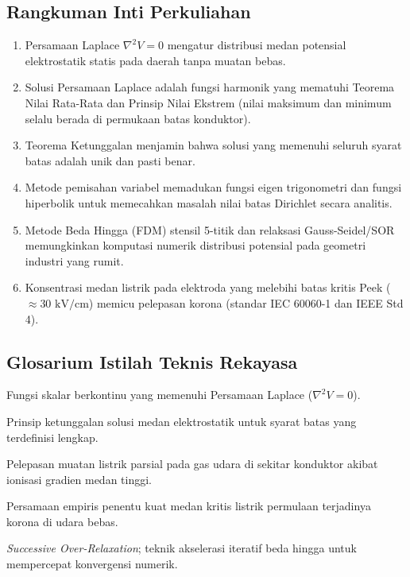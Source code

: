\documentclass[11pt,a4paper]{article}
\theoremstyle{definition}
\begin{document}
\subsection{Rangkuman Inti Perkuliahan}
\begin{enumerate}[leftmargin=*]
    \item Persamaan Laplace $\nabla^2 V = 0$ mengatur distribusi medan potensial elektrostatik statis pada daerah tanpa muatan bebas.
    \item Solusi Persamaan Laplace adalah fungsi harmonik yang mematuhi Teorema Nilai Rata-Rata dan Prinsip Nilai Ekstrem (nilai maksimum dan minimum selalu berada di permukaan batas konduktor).
    \item Teorema Ketunggalan menjamin bahwa solusi yang memenuhi seluruh syarat batas adalah unik dan pasti benar.
    \item Metode pemisahan variabel memadukan fungsi eigen trigonometri dan fungsi hiperbolik untuk memecahkan masalah nilai batas Dirichlet secara analitis.
    \item Metode Beda Hingga (FDM) stensil 5-titik dan relaksasi Gauss-Seidel/SOR memungkinkan komputasi numerik distribusi potensial pada geometri industri yang rumit.
    \item Konsentrasi medan listrik pada elektroda yang melebihi batas kritis Peek ($\approx 30\text{ kV/cm}$) memicu pelepasan korona (standar IEC 60060-1 dan IEEE Std 4).
\end{enumerate}

\subsection{Glosarium Istilah Teknis Rekayasa}
\begin{description}[leftmargin=!,labelwidth=3.5cm]
    \item[Harmonic Function] Fungsi skalar berkontinu yang memenuhi Persamaan Laplace ($\nabla^2 V = 0$).
    \item[Uniqueness Theorem] Prinsip ketunggalan solusi medan elektrostatik untuk syarat batas yang terdefinisi lengkap.
    \item[Corona Discharge] Pelepasan muatan listrik parsial pada gas udara di sekitar konduktor akibat ionisasi gradien medan tinggi.
    \item[Peek's Law] Persamaan empiris penentu kuat medan kritis listrik permulaan terjadinya korona di udara bebas.
    \item[SOR] \textit{Successive Over-Relaxation}; teknik akselerasi iteratif beda hingga untuk mempercepat konvergensi numerik.
\end{description}
\end{document}
